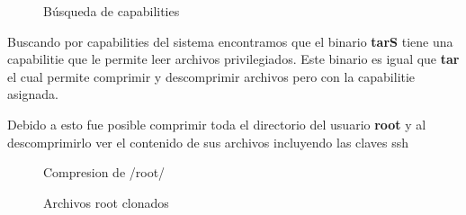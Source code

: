 \documentclass[a4paper]{article}
\begin{document}
\begin{figure}[H]
  \centering
  \setlength{\fboxrule}{0.8pt}
  \caption{Búsqueda de capabilities}
\end{figure}
\vspace{0.4cm}

Buscando por capabilities del sistema encontramos que el binario \textbf{tarS}
tiene una capabilitie que le permite leer archivos privilegiados. Este binario
es igual que \textbf{tar} el cual permite comprimir y descomprimir archivos pero con la
capabilitie asignada. \par
Debido a esto fue posible comprimir toda el directorio del usuario \textbf{root}
y al descomprimirlo ver el contenido de sus archivos incluyendo las claves ssh
\vspace{0.4cm}
\begin{figure}[H]
  \centering
  \setlength{\fboxrule}{0.8pt}
  \caption{Compresion de /root/}
\end{figure}
\vspace{0.4cm}
\begin{figure}[H]
  \centering
  \setlength{\fboxrule}{0.8pt}
  \caption{Archivos root clonados}
\end{figure}
\vspace{0.4cm}
\end{document}

